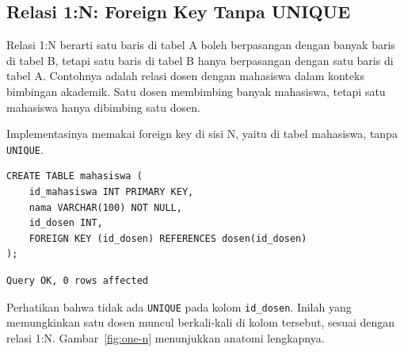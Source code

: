 \documentclass[11pt,a4paper]{article}
\begin{document}
\subsection{Relasi 1:N: Foreign Key Tanpa UNIQUE}

Relasi 1:N berarti satu baris di tabel A boleh berpasangan dengan banyak baris di tabel B, tetapi satu baris di tabel B hanya berpasangan dengan satu baris di tabel A. Contohnya adalah relasi dosen dengan mahasiswa dalam konteks bimbingan akademik. Satu dosen membimbing banyak mahasiswa, tetapi satu mahasiswa hanya dibimbing satu dosen.

Implementasinya memakai foreign key di sisi N, yaitu di tabel mahasiswa, tanpa \texttt{UNIQUE}.

\begin{lstlisting}[style=code]
CREATE TABLE mahasiswa (
    id_mahasiswa INT PRIMARY KEY,
    nama VARCHAR(100) NOT NULL,
    id_dosen INT,
    FOREIGN KEY (id_dosen) REFERENCES dosen(id_dosen)
);
\end{lstlisting}

\begin{lstlisting}[style=out]
Query OK, 0 rows affected
\end{lstlisting}

Perhatikan bahwa tidak ada \texttt{UNIQUE} pada kolom \texttt{id\_dosen}. Inilah yang memungkinkan satu dosen muncul berkali-kali di kolom tersebut, sesuai dengan relasi 1:N. Gambar~\ref{fig:one-n} menunjukkan anatomi lengkapnya.
\end{document}
